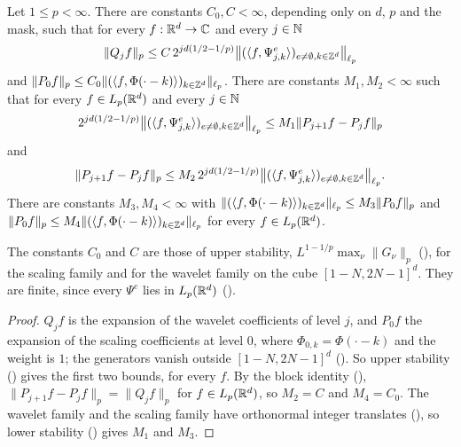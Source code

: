 \begin{proposition}
\label{prop:daub-rd-block-norms}
\leanok
{}
Let $1 \leq p < \infty$. There are constants $C_0, C < \infty$, depending only on $d$, $p$ and
the mask, such that for every $f : \mathbb{R}^d \to \mathbb{C}$ and every $j \in \mathbb{N}$
\[
  \|Q_j f\|_p \leq C \, 2^{jd(1/2 - 1/p)}
    \bigl\|(\langle f, \Psi^e_{j,k} \rangle)_{e \neq \emptyset, k \in \mathbb{Z}^d}\bigr\|_{\ell_p}
\]
and $\|P_0 f\|_p \leq C_0 \|(\langle f, \Phi(\cdot - k) \rangle)_{k \in \mathbb{Z}^d}\|_{\ell_p}$. There
are constants $M_1, M_2 < \infty$ such that for every $f \in L_p(\mathbb{R}^d)$ and every
$j \in \mathbb{N}$
\[
  2^{jd(1/2 - 1/p)} \bigl\|(\langle f, \Psi^e_{j,k} \rangle)_{e \neq \emptyset, k \in \mathbb{Z}^d}
    \bigr\|_{\ell_p} \leq M_1 \|P_{j+1} f - P_j f\|_p
\]
and
\[
  \|P_{j+1} f - P_j f\|_p \leq M_2 \, 2^{jd(1/2 - 1/p)}
    \bigl\|(\langle f, \Psi^e_{j,k} \rangle)_{e \neq \emptyset, k \in \mathbb{Z}^d}\bigr\|_{\ell_p} .
\]
There are constants $M_3, M_4 < \infty$ with
$\|(\langle f, \Phi(\cdot - k) \rangle)_{k \in \mathbb{Z}^d}\|_{\ell_p} \leq M_3 \|P_0 f\|_p$ and
$\|P_0 f\|_p \leq M_4 \|(\langle f, \Phi(\cdot - k) \rangle)_{k \in \mathbb{Z}^d}\|_{\ell_p}$ for every
$f \in L_p(\mathbb{R}^d)$.
\end{proposition}

The constants $C_0$ and $C$ are those of upper stability, $L^{1 - 1/p} \max_\nu \|G_\nu\|_p$
(), for the scaling family and for the wavelet family on the
cube $[1 - N, 2N - 1]^d$. They are finite, since every $\Psi^e$ lies in $L_p(\mathbb{R}^d)$
().

\begin{proof}
\leanok
{}
$Q_j f$ is the expansion of the wavelet coefficients of level $j$, and $P_0 f$ the expansion of
the scaling coefficients at level $0$, where $\Phi_{0,k} = \Phi(\cdot - k)$ and the weight is
$1$; the generators vanish outside $[1 - N, 2N - 1]^d$ ().
So upper stability () gives the first two bounds, for every
$f$. By the block identity (),
$\|P_{j+1} f - P_j f\|_p = \|Q_j f\|_p$ for $f \in L_p(\mathbb{R}^d)$, so $M_2 = C$ and $M_4 = C_0$. The
wavelet family and the scaling family have orthonormal integer translates
(), so lower stability ()
gives $M_1$ and $M_3$.
\end{proof}

